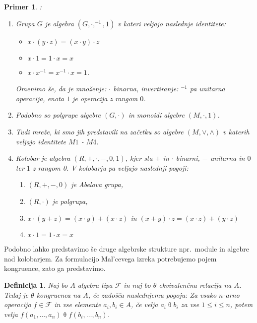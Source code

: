 \documentclass[a4paper,11pt]{article}
\newtheorem{definicija}{Definicija}
\newtheorem{primer}{Primer}
\begin{document}
\begin{primer}:
\begin{enumerate}
    \item Grupa $G$ je algebra $\left(G, \cdot, ^{-1}, 1\right)$ v kateri veljajo naslednje identitete:
    \begin{itemize}
        \item[G1] $x \cdot \left(y \cdot z\right) = \left(x \cdot y\right) \cdot z$
        \item[G2] $x \cdot 1 = 1 \cdot x = x$
        \item[G3] $x \cdot x^{-1} = x^{-1} \cdot x = 1$.
    \end{itemize} 
    Omenimo še, da je množenje: $\cdot$ binarna, invertiranje: $^{-1}$ pa unitarna operacija, enota $1$ je operacija 
    z rangom $0$. 
    \item Podobno so polgrupe algebre $\left(G, \cdot\right)$ in monoidi algebre  $\left(M, \cdot, 1\right)$.
    \item Tudi mreže, ki smo jih predstavili na začetku so algebre $\left(M,\vee, \wedge\right)$ v katerih veljajo
    identitete $M1$ - $M4$. 
    \item Kolobar je algebra $\left(R, +, \cdot, -, 0, 1\right)$, kjer sta $+$ in $\cdot$ binarni, $-$ unitarna in $0$ 
    ter $1$ z rangom 0. V kolobarju pa veljajo naslednji pogoji:
    \begin{enumerate}
        \item[R1] $\left(R, +, -, 0\right)$ je Abelova grupa,
        \item[R2] $\left(R, \cdot\right)$ je polgrupa, 
        \item[R3] $x \cdot \left(y + z\right) = \left(x \cdot y\right) + \left(x \cdot z\right)$ in
        $\left(x + y\right) \cdot z = \left(x \cdot z\right) + \left(y \cdot z\right)$
        \item[G2] $x \cdot 1 = 1 \cdot x = x$
    \end{enumerate}
\end{enumerate}
\end{primer}
Podobno lahko predstavimo še druge algebrske strukture npr.\ module in algebre nad kolobarjem.
Za formulacijo Mal'cevega izreka potrebujemo pojem kongruence, zato ga predstavimo.

\begin{definicija}
    Naj bo $A$ algebra tipa $\mathcal{F}$ in naj bo $\theta$ ekvivalenčna relacija na $A$. Tedaj je $\theta$ 
    \emph{kongruenca} na $A$, če zadošča naslednjemu pogoju: Za vsako $n$-arno operacijo $f \in \mathcal{F}$ in 
    vse elemente $a_i, b_i \in A$, če velja $a_i \mathrel{\theta} b_i$ za vse $1 \leq i \leq n$, potem velja $f \left(a_1, 
    \dots, a_n\right) \mathrel{\theta} f\left(b_i, \dots, b_n\right)$.
\end{definicija}
\end{document}

